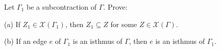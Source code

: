 Let $\Gamma_1$ be a subcontraction of $\Gamma$. Prove:

(a) If $Z_1 \in \mathcal{X}(\Gamma_1)$, then $Z_1 \subseteq Z$ for some $Z \in \mathcal{X}(\Gamma)$.

(b) If an edge $e$ of $\Gamma_1$ is an isthmus of $\Gamma$, then $e$ is an isthmus of $\Gamma_1$.
